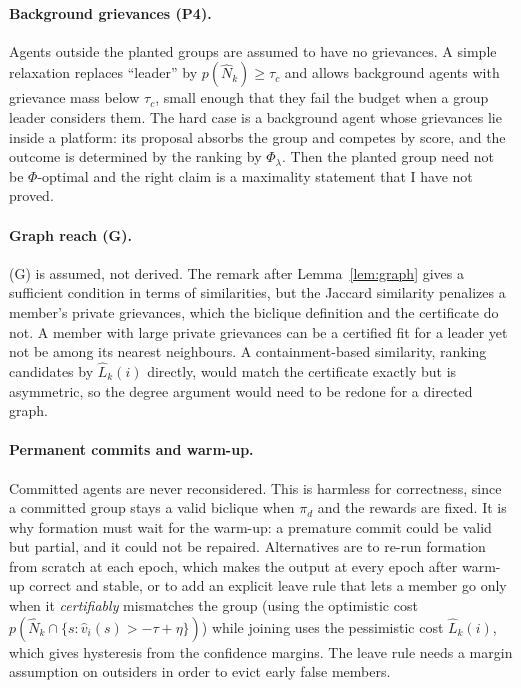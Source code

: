 \documentclass[11pt]{article}
\theoremstyle{plain}
\theoremstyle{definition}
\theoremstyle{remark}
\begin{document}
\paragraph{Background grievances (P4).}
Agents outside the planted groups are assumed to have no grievances. A simple relaxation replaces ``leader'' by $p(\hat N_k)\ge\tau_c$ and allows background agents with grievance mass below $\tau_c$, small enough that they fail the budget when a group leader considers them.
The hard case is a background agent whose grievances lie inside a platform: its proposal absorbs the group and competes by score, and the outcome is determined by the ranking by $\Phi_\lambda$. Then the planted group need not be $\Phi$-optimal and the right claim is a maximality statement that I have not proved.
 
\paragraph{Graph reach (G).}
(G) is assumed, not derived. The remark after Lemma~\ref{lem:graph} gives a sufficient condition in terms of similarities, but the Jaccard similarity penalizes a member's private grievances, which the biclique definition and the certificate do not. A member with large private grievances can be a certified fit for a leader yet not be among its nearest neighbours.
A containment-based similarity, ranking candidates by $\hat L_k(i)$ directly, would match the certificate exactly but is asymmetric, so the degree argument would need to be redone for a directed graph.
 
\paragraph{Permanent commits and warm-up.}
Committed agents are never reconsidered. This is harmless for correctness, since a committed group stays a valid biclique when $\pi_d$ and the rewards are fixed. It is why formation must wait for the warm-up:
a premature commit could be valid but partial, and it could not be repaired. Alternatives are to re-run formation from scratch at each epoch, which makes the output at every epoch after warm-up correct and stable, or to add an explicit leave rule that lets a member go only when it
\emph{certifiably} mismatches the group (using the optimistic cost $p(\hat N_k\cap\{s:\hat v_i(s)>-\tau+\eta\})$) while joining uses the pessimistic cost $\hat L_k(i)$, which gives hysteresis from the confidence margins. The leave rule needs a margin assumption on outsiders in order to evict early false members.
 
\end{document}

